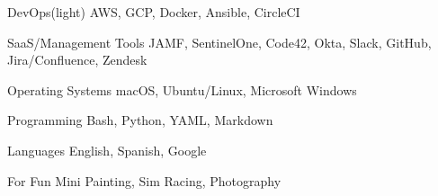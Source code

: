 

\begin{cvskills}

  \cvskill
    {DevOps(light)} %
    {AWS, GCP, Docker, Ansible, CircleCI} %

  \cvskill
    {SaaS/Management Tools} %
    {JAMF, SentinelOne, Code42, Okta, Slack, GitHub, Jira/Confluence, Zendesk} %

  \cvskill
    {Operating Systems} %
    {macOS, Ubuntu/Linux, Microsoft Windows} %

  \cvskill
    {Programming} %
    {Bash, Python, YAML, Markdown} %

  \cvskill
    {Languages} %
    {English, Spanish, Google} %

  \cvskill
    {For Fun}
    {Mini Painting, Sim Racing, Photography}

\end{cvskills}
